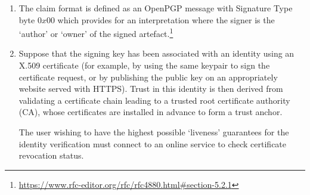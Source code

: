 \begin{example}
\begin{enumerate}
  \item
    The claim format is defined as an OpenPGP message with Signature Type byte $0x00$ \cite[\S5.2.1]{rfc4880} which provides for an interpretation where the signer is the `author' or `owner' of the signed artefact.\footnote{\url{https://www.rfc-editor.org/rfc/rfc4880.html\#section-5.2.1}}

  \item
    Suppose that the signing key has been associated with an identity using an X.509 certificate (for example, by using the same keypair to sign the certificate request, or by publishing the public key on an appropriately website served with HTTPS).
    Trust in this identity is then derived from validating a certificate chain leading to a trusted root certificate authority (CA), whose certificates are installed in advance to form a trust anchor.

    The user wishing to have the highest possible `liveness' guarantees for the identity verification must connect to an online service to check certificate revocation status.

  \end{enumerate}

\end{example}

